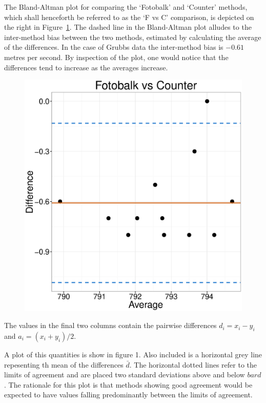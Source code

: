 \documentclass[12pt, a4paper]{report}
\theoremstyle{plain}
\theoremstyle{definition}
\theoremstyle{remark}
\begin{document}
The Bland-Altman plot for comparing the `Fotobalk' and `Counter' methods, which shall henceforth be referred to as the `F vs C' comparison, is depicted on the right in Figure~\ref{fig:FotobalkVsCounter}. The dashed line in the Bland-Altman plot alludes to the inter-method bias between the two methods, estimated by calculating the average of the differences. In the case of Grubbs data the inter-method bias is $-0.61$ metres per second. By inspection of the plot, one would notice that the differences tend to increase as the averages increase.

\begin{figure}
\centering
\includegraphics[width=0.55\linewidth]{images/FotobalkVsCounter}
\caption{}
\label{fig:FotobalkVsCounter}
\end{figure}




The values in the final two columns contain the pairwise differences $d_i = x_i - y_i$ and $a_i = {(x_i + y_i)/2} $.


A plot of this quantities is show in figure 1. Also included is a horizontal grey line repesenting th mean of the differences $\bar{d}$. The horizontal dotted lines refer to the limits of agreement and are placed two standard deviations above and below $bar{d}$. The rationale for this plot is that methods showing good agreement would be expected to  have values falling predominantly between the limits of agreement.

\end{document}
